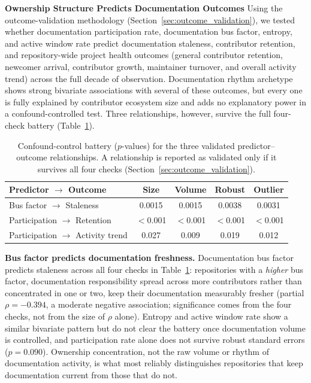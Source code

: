 \documentclass[10pt,conference]{IEEEtran}
\begin{document}
{{\textbf{Ownership Structure Predicts Documentation Outcomes}
\label{sec:predictive_validity}
Using the outcome-validation methodology (Section~\ref{sec:outcome_validation}), we tested whether documentation participation rate, documentation bus factor, entropy, and active window rate predict documentation staleness, contributor retention, and repository-wide project health outcomes (general contributor retention, newcomer arrival, contributor growth, maintainer turnover, and overall activity trend) across the full decade of observation. Documentation rhythm archetype shows strong bivariate associations with several of these outcomes, but every one is fully explained by contributor ecosystem size and adds no explanatory power in a confound-controlled test. Three relationships, however, survive the full four-check battery (Table~\ref{tab:predictive_validity}).

\vspace{-6pt}
\begin{table}[h]
\centering
\small
\caption{Confound-control battery ($p$-values) for the three validated predictor--outcome relationships. A relationship is reported as validated only if it survives all four checks (Section~\ref{sec:outcome_validation}).}
\label{tab:predictive_validity}
\setlength{\tabcolsep}{3pt}
\renewcommand{\arraystretch}{1.25}
\begin{tabular}{p{3.1cm}cccc}
\toprule
\textbf{Predictor $\rightarrow$ Outcome} & \textbf{Size} & \textbf{Volume} & \textbf{Robust} & \textbf{Outlier} \\
\midrule
Bus factor $\rightarrow$ Staleness & 0.0015 & 0.0015 & 0.0038 & 0.0031 \\
Participation $\rightarrow$ Retention & $<$0.001 & $<$0.001 & $<$0.001 & $<$0.001 \\
Participation $\rightarrow$ Activity trend & 0.027 & 0.009 & 0.019 & 0.012 \\
\bottomrule
\end{tabular}
\end{table}
\vspace{-6pt}

\textbf{Bus factor predicts documentation freshness.} Documentation bus factor predicts staleness across all four checks in Table~\ref{tab:predictive_validity}: repositories with a \textit{higher} bus factor, documentation responsibility spread across more contributors rather than concentrated in one or two, keep their documentation measurably fresher (partial $\rho = -0.394$, a moderate negative association; significance comes from the four checks, not from the size of $\rho$ alone). Entropy and active window rate show a similar bivariate pattern but do not clear the battery once documentation volume is controlled, and participation rate alone does not survive robust standard errors ($p = 0.090$). Ownership concentration, not the raw volume or rhythm of documentation activity, is what most reliably distinguishes repositories that keep documentation current from those that do not.

}}
\end{document}
